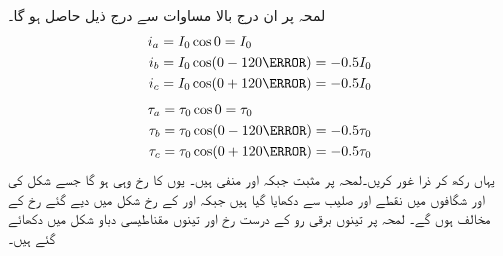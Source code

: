 لمحہ  پر ان درج بالا مساوات سے درج ذیل حاصل ہو گا۔
\begin{gather}
\begin{aligned}
i_a&=I_0 \cos 0=I_0\\
i_b&=I_0 \cos (0-120\degree)=-0.5 I_0\\
i_c&=I_0 \cos (0+120\degree)=-0.5 I_0
\end{aligned}
\end{gather}
%
\begin{gather}
\begin{aligned}
\tau_a&=\tau_0 \cos 0=\tau_0\\
\tau_b&=\tau_0 \cos (0-120\degree)=-0.5 \tau_0\\
\tau_c&=\tau_0 \cos (0+120\degree)=-0.5 \tau_0
\end{aligned}
\end{gather}
یہاں رکھ کر ذرا غور کریں۔لمحہ   پر   مثبت  جبکہ  اور  منفی ہیں۔ یوں   کا رخ وہی  ہو گا جسے  شکل   کی   اور  شگافوں میں نقطے اور صلیب سے  دکھایا گیا ہیں جبکہ   اور  کے رخ شکل میں دیے گئے رخ کے مخالف ہوں گے۔ لمحہ  پر  تینوں برقی رو کے درست رخ اور  تینوں مقناطیسی دباو  شکل   میں دکھائے گئے ہیں۔
